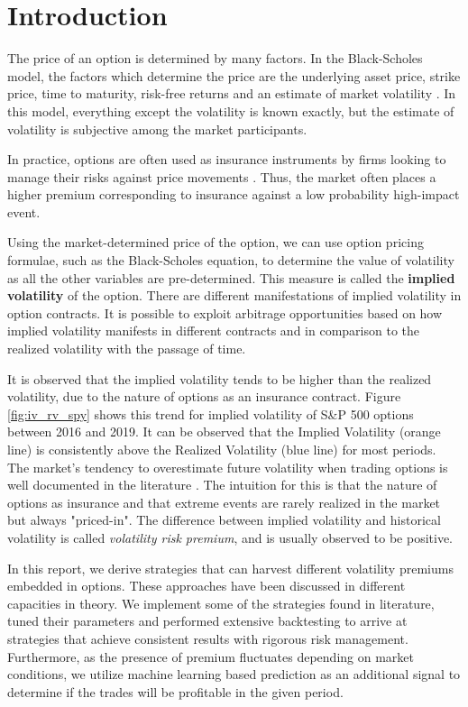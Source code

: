 \documentclass[10pt]{article}
\theoremstyle{definition}
\begin{document}
\section{Introduction}

The price of an option is determined by many factors. In the Black-Scholes model, the factors which determine the price are the underlying asset price, strike price, time to maturity, risk-free returns and an estimate of market volatility \citep{Black1973May}. In this model, everything except the volatility is known exactly, but the estimate of volatility is subjective among the market participants.

In practice, options are often used as insurance instruments by firms looking to manage their risks against price movements \citep{daily_options_2018}. Thus, the market often places a higher premium corresponding to insurance against a low probability high-impact event. 

Using the market-determined price of the option, we can use option pricing formulae, such as the Black-Scholes equation, to determine the value of volatility as all the other variables are pre-determined. This measure is called the \textbf{implied volatility} of the option. There are different manifestations of implied volatility in option contracts. It is possible to exploit arbitrage opportunities based on how implied volatility manifests in different contracts and in comparison to the realized volatility with the passage of time. 

It is observed that the implied volatility tends to be higher than the realized volatility, due to the nature of options as an insurance contract. Figure \ref{fig:iv_rv_spy} shows this trend for implied volatility of S\&P 500 options between 2016 and 2019. It can be observed that the Implied Volatility (orange line) is consistently above the Realized Volatility (blue line) for most periods.  The market's tendency to overestimate future volatility when trading options is well documented in the literature \cite{jiang2007extracting} \cite{lockwood2022information}. The intuition for this is that the nature of options as insurance and that extreme events are rarely realized in the market but always "priced-in". The difference between implied volatility and historical volatility is called \textit{volatility risk premium}, and is usually observed to be positive. 

In this report, we derive strategies that can harvest different volatility premiums embedded in options. These approaches have been discussed in different capacities in theory. We implement some of the strategies found in literature, tuned their parameters and performed extensive backtesting to arrive at strategies that achieve consistent results with rigorous risk management. Furthermore, as the presence of premium fluctuates depending on market conditions, we utilize machine learning based prediction as an additional signal to determine if the trades will be profitable in the given period.  
\end{document}
